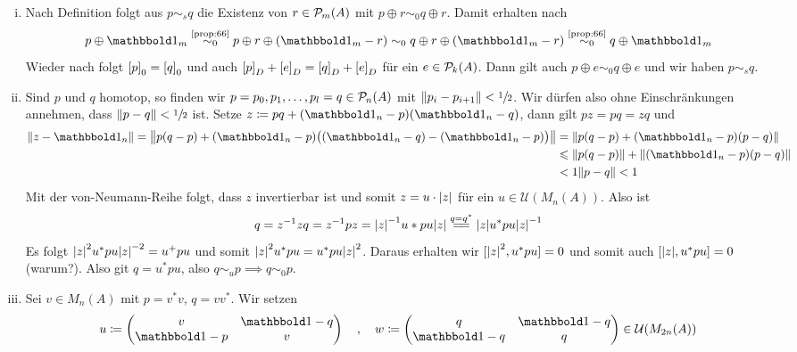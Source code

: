 \begin{beweis}
	\begin{enumerate}[(i)]
		\item Nach Definition folgt aus $p \sim_s q$ die Existenz von $r \in \kernedP_m(A)$ mit $p \oplus r \sim_0 q \oplus r$.
		Damit erhalten nach 
		\[
			p \oplus \ind_m \StackText{\ref{prop:66}}{\sim_0} p \oplus r \oplus (\ind_m -r) \sim_0 q \oplus r \oplus (\ind_m -r) \StackText{\ref{prop:66}}{\sim_0} q \oplus \ind_m
		\]
		Wieder nach  folgt $\benbrace*{p}_0 = \benbrace*{q}_0$ und auch $\benbrace*{p}_D + \benbrace*{e}_D = \benbrace*{q}_D + \benbrace*{e}_D$ für ein $e \in \kernedP_k(A)$.
		Dann gilt auch $p \oplus e \sim_0 q \oplus e$ und wir haben $p \sim_s q$.
		\item Sind $p$ und $q$ homotop, so finden wir $p=p_0, p_1, \ldots , p_l=q \in \kernedP_n(A)$ mit $\norm*{p_i - p_{i+1}} < \sfrac{1}{2}$.
		Wir dürfen also ohne Einschränkungen annehmen, dass $\norm*{p-q} < \sfrac{1}{2}$ ist.
		Setze $z \coloneqq pq + (\ind_n -p)(\ind_n -q)$, dann gilt $pz = pq = zq$ und
		\begin{align}
			\norm*{z- \ind_n} = \norm*{p(q-p) + (\ind_n -p) \enbrace[\big]{(\ind_n -q) -(\ind_n -p)}} &= \norm*{p(q-p) + (\ind_n-p)(p-q)} \\
			&\le \norm*{p(q-p)} +\norm*{(\ind_n-p)(p-q)} \\
			&< 1 \norm*{p-q} < 1
		\end{align}
		Mit der von-Neumann-Reihe folgt, dass $z$ invertierbar ist und somit $z=u \cdot \abs*{z}$ für ein $u \in \mathcal{U}(M_n(A))$.
		Also ist 
		\[
			q= z^{-1}zq = z^{-1}pz = \abs*{z}^{-1} u* p u \abs*{z}  \stackrel{q=q^*}{=\joinrel=} \abs*{z} u^* p u \abs*{z}^{-1}  
		\]
		Es folgt $\abs*{z}^2 u^* p u \abs*{z}^{-2} = u^+ p u$ und somit $\abs*{z}^2 u^* p u = u^* p u \abs*{z}^2$.
		Daraus erhalten wir $\benbrace{\abs*{z}^2, u^*p u }=0$ und somit auch $\benbrace*{\abs*{z},u^*pu} =0$ (warum?).
		Also git $q = u^* p u$, also $q \sim_u p \implies q \sim_0 p$.
		\item Sei $v \in M_n(A)$ mit $p=v^*v$, $q=vv^*$.
		Wir setzen 
		\[
			u \coloneqq \begin{pmatrix}
				v & \ind - q \\
				\ind -p & v
			\end{pmatrix} \quad, \quad 
			w \coloneqq \begin{pmatrix}
				q & \ind -q \\
				\ind -q & q
			\end{pmatrix} \in \mathcal{U} \enbrace*{M_{2n}(A)}
\]
\end{enumerate}
\end{beweis}
